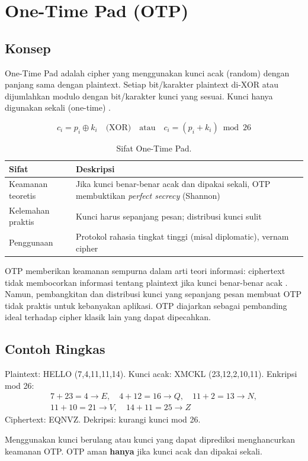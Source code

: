 \section{One-Time Pad (OTP)}

\subsection{Konsep}

One-Time Pad adalah cipher yang menggunakan kunci acak (random) dengan panjang sama dengan plaintext. Setiap bit/karakter plaintext di-XOR atau dijumlahkan modulo dengan bit/karakter kunci yang sesuai. Kunci hanya digunakan sekali (one-time) \cite{katz2020,stallings2017}.

\[
c_i = p_i \oplus k_i \quad \text{(XOR)} \quad \text{atau} \quad c_i = (p_i + k_i) \bmod 26
\]

\begin{table}[htbp]
  \centering
  \small
  \begin{tabular}{@{}p{3.2cm}p{9.2cm}@{}}
    \toprule
    Sifat & Deskripsi \\
    \midrule
    Keamanan teoretis & Jika kunci benar-benar acak dan dipakai sekali, OTP membuktikan \textit{perfect secrecy} (Shannon) \\
    Kelemahan praktis & Kunci harus sepanjang pesan; distribusi kunci sulit \\
    Penggunaan & Protokol rahasia tingkat tinggi (misal diplomatic), vernam cipher \\
    \bottomrule
  \end{tabular}
  \caption{Sifat One-Time Pad.}
\end{table}

OTP memberikan keamanan sempurna dalam arti teori informasi: ciphertext tidak membocorkan informasi tentang plaintext jika kunci benar-benar acak \cite{rosulek2021}. Namun, pembangkitan dan distribusi kunci yang sepanjang pesan membuat OTP tidak praktis untuk kebanyakan aplikasi. OTP diajarkan sebagai pembanding ideal terhadap cipher klasik lain yang dapat dipecahkan.

\subsection{Contoh Ringkas}

Plaintext: HELLO (7,4,11,11,14). Kunci acak: XMCKL (23,12,2,10,11). Enkripsi mod 26:
\begin{align*}
7+23=4 \to E,\quad 4+12=16 \to Q,\quad 11+2=13 \to N,\\
11+10=21 \to V,\quad 14+11=25 \to Z
\end{align*}
Ciphertext: EQNVZ. Dekripsi: kurangi kunci mod 26.

\begin{catatan}
Menggunakan kunci berulang atau kunci yang dapat diprediksi menghancurkan keamanan OTP. OTP aman \textbf{hanya} jika kunci acak dan dipakai sekali.
\end{catatan}
